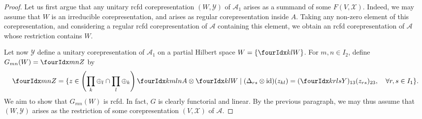 \begin{proof}
Let us first argue that any unitary rcfd corepresentation $(W,\mathscr{Y})$ of $\mathscr{A}_1$ arises as a summand of some $F(V,\mathscr{X})$. Indeed, we may assume that $W$ is an irreducible corepresentation, and arises as regular corepresentation inside $A$. Taking any non-zero element of this corepresentation, and considering a regular rcfd corepresentation of $\mathscr{A}$ containing this element, we obtain an rcfd corepresentation of $\mathscr{A}$ whose restriction contains $W$.

Let now $\mathscr{Y}$ define a unitary corepresentation of $\mathscr{A}_1$ on a partial Hilbert space $W= \{\Gru{W}{k}{l}\}$. For $m,n\in I_{2}$, define $G_{mn}(W) = \Gru{Z}{m}{n}$ by \[ \Gru{Z}{m}{n} = \{z \in \left(\prod_k\oplus_l\cap \prod_l\oplus_k\right) \Gr{A}{k}{l}{m}{n}\otimes \Gru{W}{k}{l}\mid (\Delta_{rs}\otimes \id)(z_{kl}) = (\Gr{Y}{k}{l}{r}{s})_{13}(z_{rs})_{23},\quad \forall r,s\in I_1\}.\] We aim to show that $G_{mn}(W)$ is rcfd. In fact, $G$ is clearly functorial and linear. By the previous paragraph, we may thus assume that $(W,\mathscr{Y})$ arises as the restriction of some corepresentation $(V,\mathscr{X})$ of $\mathscr{A}$. 


\end{proof}
